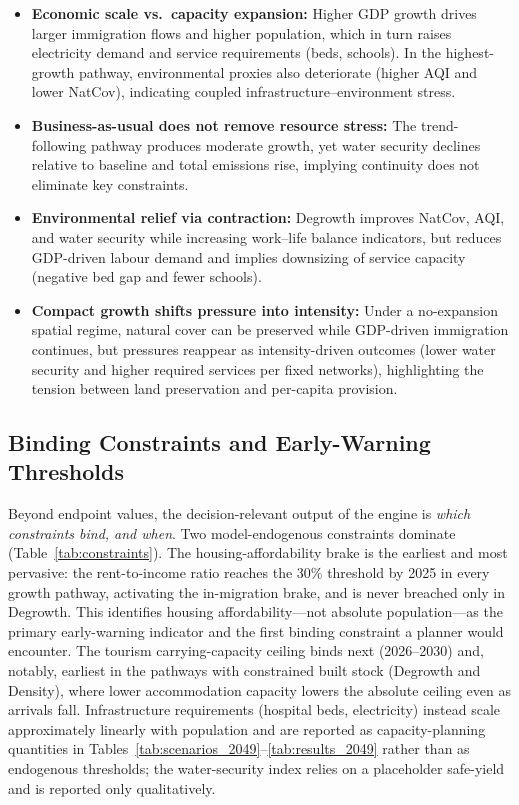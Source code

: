 \documentclass[urbansci,article,submit,pdftex,moreauthors]{Definitions/mdpi}
\begin{document}
\begin{itemize}
\item \textbf{Economic scale vs.\ capacity expansion:} Higher GDP growth
      drives larger immigration flows and higher population, which in turn
      raises electricity demand and service requirements (beds, schools).
      In the highest-growth pathway, environmental proxies also deteriorate
      (higher AQI and lower NatCov), indicating coupled
      infrastructure--environment stress.
\item \textbf{Business-as-usual does not remove resource stress:} The
      trend-following pathway produces moderate growth, yet water security
      declines relative to baseline and total emissions rise, implying
      continuity does not eliminate key constraints.
\item \textbf{Environmental relief via contraction:} Degrowth improves
      NatCov, AQI, and water security while increasing work--life balance
      indicators, but reduces GDP-driven labour demand and implies downsizing
      of service capacity (negative bed gap and fewer schools).
\item \textbf{Compact growth shifts pressure into intensity:} Under a
      no-expansion spatial regime, natural cover can be preserved while
      GDP-driven immigration continues, but pressures reappear as
      intensity-driven outcomes (lower water security and higher required
      services per fixed networks), highlighting the tension between land
      preservation and per-capita provision.
\end{itemize}

\subsection{Binding Constraints and Early-Warning Thresholds}
\label{subsec:constraints}

Beyond endpoint values, the decision-relevant output of the engine is \emph{which
constraints bind, and when}. Two model-endogenous constraints dominate
(Table~\ref{tab:constraints}). The housing-affordability brake is the earliest and
most pervasive: the rent-to-income ratio reaches the 30\% threshold by 2025 in every
growth pathway, activating the in-migration brake, and is never breached only in
Degrowth. This identifies housing affordability---not absolute population---as the
primary early-warning indicator and the first binding constraint a planner would
encounter. The tourism carrying-capacity ceiling binds next (2026--2030) and, notably,
earliest in the pathways with constrained built stock (Degrowth and Density), where
lower accommodation capacity lowers the absolute ceiling even as arrivals fall.
Infrastructure requirements (hospital beds, electricity) instead scale approximately
linearly with population and are reported as capacity-planning quantities in
Tables~\ref{tab:scenarios_2049}--\ref{tab:results_2049} rather than as endogenous
thresholds; the water-security index relies on a placeholder safe-yield and is reported
only qualitatively.
\end{document}
